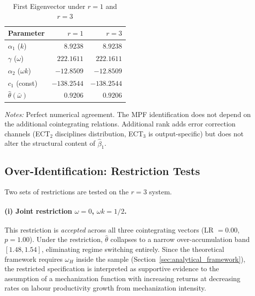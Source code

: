 \begin{table}[H]
\centering
\caption{First Eigenvector under $r = 1$ and $r = 3$}
\label{tab:sa:rank_invariance}
\begin{threeparttable}
\begin{tabular}{lrr}
\toprule
Parameter & $r = 1$ & $r = 3$ \\
\midrule
$\alpha_1$ ($k$)         & $8.9238$    & $8.9238$ \\
$\gamma$ ($\omega$)      & $222.1611$  & $222.1611$ \\
$\alpha_2$ ($\omega k$)  & $-12.8509$  & $-12.8509$ \\
$c_1$ (const)            & $-138.2544$ & $-138.2544$ \\
$\hat{\theta}(\bar{\omega})$ & $0.9206$ & $0.9206$ \\
\bottomrule
\end{tabular}
\begin{tablenotes}
\small
\item \textit{Notes:} Perfect numerical agreement. The MPF
identification does not depend on the additional cointegrating
relations. Additional rank adds error correction channels (ECT$_2$
disciplines distribution, ECT$_3$ is output-specific) but does not
alter the structural content of $\hat{\beta}_1$.
\end{tablenotes}
\end{threeparttable}
\end{table}


\subsection{Over-Identification: Restriction Tests}
\label{app:sa:restrictions}

Two sets of restrictions are tested on the $r = 3$ system.

\paragraph{(i) Joint restriction $\omega = 0$, $\omega k = 1/2$.}
This restriction is \emph{accepted} across all three cointegrating vectors
(LR $= 0.00$, $p = 1.00$). Under the restriction, $\hat{\theta}$
collapses to a narrow over-accumulation band $[1.48, 1.54]$, eliminating
regime switching entirely. Since the theoretical framework requires
$\omega_H$ inside the sample (Section~\ref{sec:analytical_framework}),
the restricted specification is interpreted as supportive evidence to the assumption of a mechanization function with increasing returns at decreasing rates on labour productivity growth from mechanization intensity.

